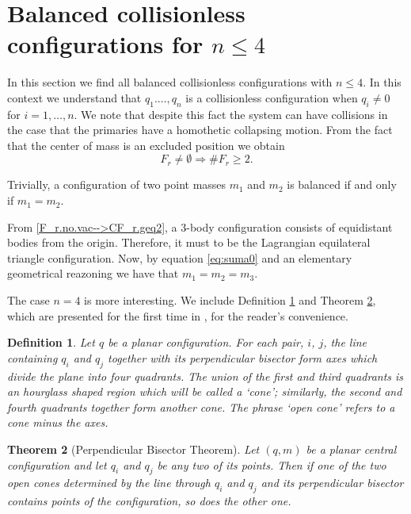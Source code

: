 \documentclass[twoside]{article}
\newtheorem{thm}{Theorem}[section]
\newtheorem{defi}[thm]{Definition}
\theoremstyle{remark}
\begin{document}
\section{Balanced collisionless configurations for $n\leq 4$}\label{sec:addmisibles}

In this section we find all balanced collisionless configurations with $n\leq 4$. In this context we understand that   $q_1.\ldots,q_n$ is a collisionless configuration  when $q_i\neq 0$ for $i=1,\ldots,n$. We note that despite this fact the system can have collisions in the case that the primaries have a homothetic collapsing motion.  From the fact that the center of mass is an excluded position we obtain
\begin{equation}\label{F_r.no.vac-->CF_r.geq2}
 F_r\neq \emptyset \Rightarrow \# F_r\geq 2.
\end{equation}



Trivially, a configuration of two point masses $m_1$ and $m_2$ is balanced if and only if $m_1=m_2$.

From \eqref{F_r.no.vac-->CF_r.geq2}, a $3$-body configuration consists of equidistant  bodies from the origin. Therefore, it must to be the Lagrangian equilateral triangle configuration. Now, by equation \eqref{eq:suma0} and an elementary geometrical reazoning   we have that $m_1=m_2=m_3$.

The case $n=4$ is more interesting. We include Definition \ref{def:bis.per} and Theorem \ref{thm:bisector.moeckel}, which are presented for the first time in  \cite{moeckel1990central}, for the reader's convenience.

\begin{defi}\label{def:bis.per}
Let $q$ be a planar configuration. For each pair, $i$, $j$, the line
containing $q_i$ and $q_j$ together with its perpendicular bisector form axes which
divide the plane into four quadrants. The union of the first and third quadrants
is an hourglass shaped region which will be called a `cone'; similarly,
the second and fourth quadrants together form another cone. The phrase `open
cone' refers to a cone minus the axes.
\end{defi}

\begin{thm}[Perpendicular Bisector Theorem]\label{thm:bisector.moeckel}
Let $(q,m)$ be a planar central configuration and let
$q_i$ and $q_j$ be any two of its points. Then if one of the two open cones determined
by the line through $q_i$ and $q_j$ and its perpendicular bisector contains points of
the configuration, so does the other one.
\end{thm}
\end{document}
